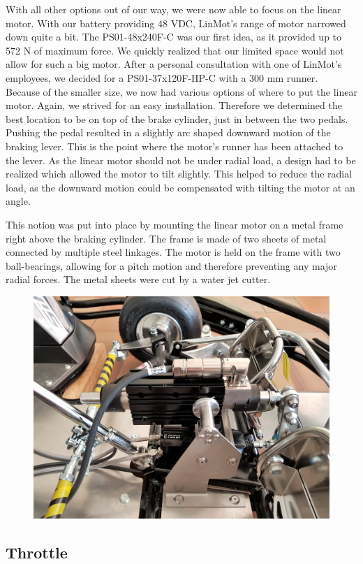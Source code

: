 With all other options out of our way, we were now able to focus on the linear motor.
With our battery providing 48 VDC, LinMot's range of motor narrowed down quite a bit. The PS01-48x240F-C was our first idea, as it provided up to 572 N of maximum force. We quickly realized that our limited space would not allow for such a big motor. After a personal consultation with one of LinMot's employees, we decided for a PS01-37x120F-HP-C with a 300 mm runner.\\ Because of the smaller size, we now had various options of where to put the linear motor. Again, we strived for an easy installation. Therefore we determined the best location to be on top of the brake cylinder, just in between the two pedals. Pushing the pedal resulted in a slightly arc shaped downward motion of the braking lever. This is the point where the motor's runner has been attached to the lever. As the linear motor should not be under radial load, a design had to be realized which allowed the motor to tilt slightly. This helped to reduce the radial load, as the downward motion could be compensated with tilting the motor at an angle.

This notion was put into place by mounting the linear motor on a metal frame right above the braking cylinder. The frame is made of two sheets of metal connected by multiple steel linkages. The motor is held on the frame with two ball-bearings, allowing for a pitch motion and therefore preventing any major radial forces.
The metal sheets were cut by a water jet cutter.

\begin{figure}[h]
	\centering
	\includegraphics[width=0.7\linewidth]{pictures_figures/Used/Picture_brake}
	\caption{}
	\label{fig:picturebrake}
\end{figure}


\subsection{Throttle}

